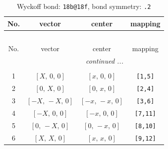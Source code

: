 \documentclass[fleqn,8pt]{jsarticle}
\begin{document}
\begin{longtable}{cccc}
\caption{Wyckoff bond: {\tt 18b@18f}, bond symmetry: {\tt .2}}
 \\
 \hline \hline
No. & vector & center & mapping \\ \hline \endfirsthead

\multicolumn{3}{l}{\tablename\ \thetable{}} \\
 \hline \hline
No. & vector & center & mapping \\ \hline \endhead

 \hline \hline
\multicolumn{3}{r}{\footnotesize\it continued ...} \\ \endfoot

 \hline \hline
\multicolumn{3}{r}{} \\ \endlastfoot

1 & $\left[ X,\, 0,\, 0 \right]$ & $\left[ x,\, 0,\, 0 \right]$ & {\tt [1,5]} \\ \hline
2 & $\left[ 0,\, X,\, 0 \right]$ & $\left[ 0,\, x,\, 0 \right]$ & {\tt [2,4]} \\ \hline
3 & $\left[ - X,\, - X,\, 0 \right]$ & $\left[ - x,\, - x,\, 0 \right]$ & {\tt [3,6]} \\ \hline
4 & $\left[ - X,\, 0,\, 0 \right]$ & $\left[ - x,\, 0,\, 0 \right]$ & {\tt [7,11]} \\ \hline
5 & $\left[ 0,\, - X,\, 0 \right]$ & $\left[ 0,\, - x,\, 0 \right]$ & {\tt [8,10]} \\ \hline
6 & $\left[ X,\, X,\, 0 \right]$ & $\left[ x,\, x,\, 0 \right]$ & {\tt [9,12]} \\
\end{longtable}
\renewcommand{\arraystretch}{1.2}
\end{document}
